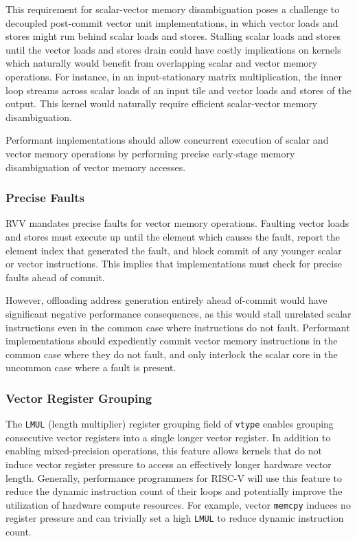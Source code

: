 This requirement for scalar-vector memory disambiguation poses a challenge to decoupled post-commit vector unit implementations, in which vector loads and stores might run behind scalar loads and stores.
Stalling scalar loads and stores until the vector loads and stores drain could have costly implications on kernels which naturally would benefit from overlapping scalar and vector memory operations.
For instance, in an input-stationary matrix multiplication, the inner loop streams across scalar loads of an input tile and vector loads and stores of the output.
This kernel would naturally require efficient scalar-vector memory disambiguation.

Performant implementations should allow concurrent execution of scalar and vector memory operations by performing precise early-stage memory disambiguation of vector memory accesses.


\subsubsection{Precise Faults}

RVV mandates precise faults for vector memory operations.
Faulting vector loads and stores must execute up until the element which causes the fault, report the element index that generated the fault, and block commit of any younger scalar or vector instructions.
This implies that implementations must check for precise faults ahead of commit.

However, offloading address generation entirely ahead of-commit would have significant negative performance consequences, as this would stall unrelated scalar instructions even in the common case where instructions do not fault.
Performant implementations should expediently commit vector memory instructions in the common case where they do not fault, and only interlock the scalar core in the uncommon case where a fault is present.


\subsubsection{Vector Register Grouping}

The \texttt{LMUL} (length multiplier) register grouping field of \texttt{vtype} enables grouping consecutive vector registers into a single longer vector register.
In addition to enabling mixed-precision operations, this feature allows kernels that do not induce vector register pressure to access an effectively longer hardware vector length.
Generally, performance programmers for RISC-V will use this feature to reduce the dynamic instruction count of their loops and potentially improve the utilization of hardware compute resources.
For example, vector \texttt{memcpy} induces no register pressure and can trivially set a high \texttt{LMUL} to reduce dynamic instruction count.

